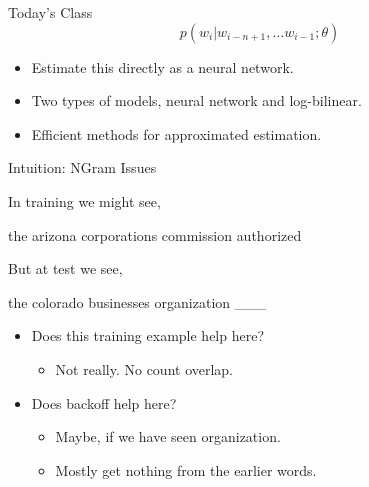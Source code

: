 \documentclass{beamer}
\begin{document}
\begin{frame}{Today's Class }
  \[ p(w_i | w_{i-n+1}, \ldots w_{i-1}; \theta) \] 

  \begin{itemize}
  \item Estimate this directly as a neural network.
    \air 

  \item Two types of models, neural network and log-bilinear. 
    \air 

  \item Efficient methods for approximated estimation.
  \end{itemize}
\end{frame}


\begin{frame}{Intuition: NGram Issues}
  
  In training we might see, 

  \begin{center}
    the arizona corporations commission \alert{authorized}
  \end{center}

  But at test we see, 
  \begin{center}
    the colorado businesses organization \alert{\_\_\_}
  \end{center}
  \pause 
  
  \begin{itemize}
  \item Does this training example help here?
    \begin{itemize}
    \item Not really. No count overlap.
    \end{itemize}
    \air 
    \pause 
  \item Does backoff help here? 
    \begin{itemize}
    \item Maybe, if we have seen organization.
    \item Mostly get nothing from the earlier words.
    \end{itemize}
  \end{itemize}
\end{frame}
\end{document}

